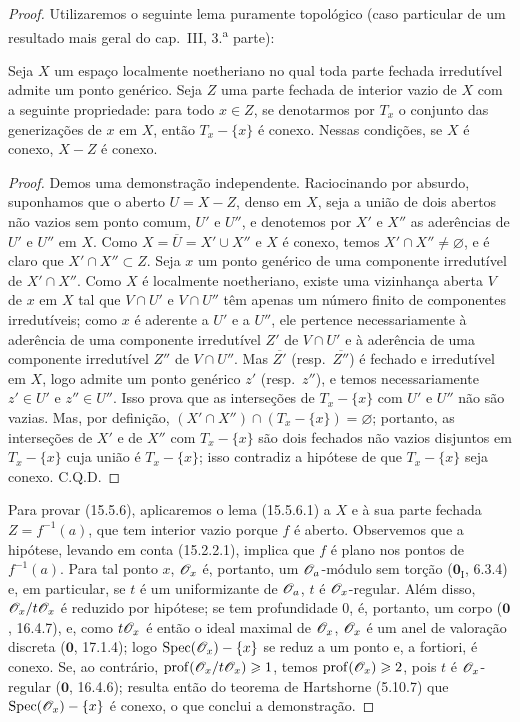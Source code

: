 \begin{proof}
Utilizaremos o seguinte lema puramente topológico (caso particular de um resultado mais geral do cap.\ III, 3.\textsuperscript{a} parte):
\begin{lemma}[15.5.6.1]
\label{IV.15.5.6.1}
Seja $X$ um espaço localmente noetheriano no qual toda parte fechada irredutível admite um ponto genérico. Seja $Z$ uma parte fechada de interior vazio de $X$ com a seguinte propriedade: para todo $x\in Z$, se denotarmos por $T_x$ o conjunto das generizações de $x$ em $X$, então $T_x-\{x\}$ é conexo. Nessas condições, se $X$ é conexo, $X-Z$ é conexo.
\end{lemma}

\begin{proof}
Demos uma demonstração independente. Raciocinando por absurdo, suponhamos que o aberto $U=X-Z$, denso em $X$, seja a união de dois abertos não vazios sem ponto comum, $U'$ e $U''$, e denotemos por $X'$ e $X''$ as aderências de $U'$ e $U''$ em $X$. Como $X=\overline{U}=X'\cup X''$ e $X$ é conexo, temos $X'\cap X''\ne\varnothing$, e é claro que $X'\cap X''\subset Z$. Seja $x$ um ponto genérico de uma componente irredutível de $X'\cap X''$. Como $X$ é localmente noetheriano, existe uma vizinhança aberta $V$ de $x$ em $X$ tal que $V\cap U'$ e $V\cap U''$ têm apenas um número finito de componentes irredutíveis; como $x$ é aderente a $U'$ e a $U''$, ele pertence necessariamente à aderência de uma componente irredutível $Z'$ de $V\cap U'$ e à aderência de uma componente irredutível $Z''$ de $V\cap U''$. Mas $\overline{Z'}$ (resp.\ $\overline{Z''}$) é fechado e irredutível em $X$, logo admite um ponto genérico $z'$ (resp.\ $z''$), e temos necessariamente $z'\in U'$ e $z''\in U''$. Isso prova que as interseções de $T_x-\{x\}$ com $U'$ e $U''$ não são vazias. Mas, por definição, $(X'\cap X'')\cap(T_x-\{x\})=\varnothing$; portanto, as interseções de $X'$ e de $X''$ com $T_x-\{x\}$ são dois fechados não vazios disjuntos em $T_x-\{x\}$ cuja união é $T_x-\{x\}$; isso contradiz a hipótese de que $T_x-\{x\}$ seja conexo. C.Q.D.
\end{proof}
Para provar (15.5.6), aplicaremos o lema (15.5.6.1) a $X$ e à sua parte fechada $Z=f^{-1}(a)$, que tem interior vazio porque $f$ é aberto. Observemos que a hipótese, levando em conta (15.2.2.1), implica que $f$ é plano nos pontos de $f^{-1}(a)$. Para tal ponto $x$, $\mathscr{O}_x$ é, portanto, um $\mathscr{O}_a$-módulo sem torção ($\mathbf{0}_{\mathrm I}$, 6.3.4) e, em particular, se $t$ é um uniformizante de $\mathscr{O}_a$, $t$ é $\mathscr{O}_x$-regular. Além disso, $\mathscr{O}_x/t\mathscr{O}_x$ é reduzido por hipótese; se tem profundidade $0$, é, portanto, um corpo ($\mathbf{0}$, 16.4.7), e, como $t\mathscr{O}_x$ é então o ideal maximal de $\mathscr{O}_x$, $\mathscr{O}_x$ é um anel de valoração discreta ($\mathbf{0}$, 17.1.4); logo $\operatorname{Spec}(\mathscr{O}_x)-\{x\}$ se reduz a um ponto e, a fortiori, é conexo. Se, ao contrário, $\operatorname{prof}(\mathscr{O}_x/t\mathscr{O}_x)\geqslant 1$, temos $\operatorname{prof}(\mathscr{O}_x)\geqslant 2$, pois $t$ é $\mathscr{O}_x$-regular ($\mathbf{0}$, 16.4.6); resulta então do teorema de Hartshorne (5.10.7) que $\operatorname{Spec}(\mathscr{O}_x)-\{x\}$ é conexo, o que conclui a demonstração.
\end{proof}

